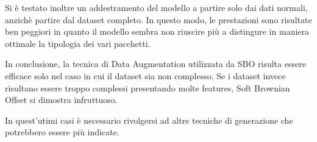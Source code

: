 Si è testato inoltre un addestramento del modello a partire solo dai dati normali, anzichè partire dal dataset completo. In questo modo, le prestazioni sono risultate ben peggiori in quanto il modello sembra non riuscire più a distingure in maniera ottimale la tipologia dei vari pacchetti.

In conclusione, la tecnica di Data Augmentation utilizzata da SBO risulta essere efficace solo nel caso in cui il dataset sia non complesso. Se i dataset invece risultano essere troppo complessi presentando molte features, Soft Brownian Offset si dimostra infruttuoso.

In quest'utimi casi è necessario rivolgersi ad altre tecniche di generazione che potrebbero essere più indicate.
